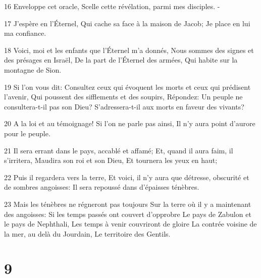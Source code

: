\par 16 Enveloppe cet oracle, Scelle cette révélation, parmi mes disciples. -
\par 17 J'espère en l'Éternel, Qui cache sa face à la maison de Jacob; Je place en lui ma confiance.
\par 18 Voici, moi et les enfants que l'Éternel m'a donnés, Nous sommes des signes et des présages en Israël, De la part de l'Éternel des armées, Qui habite sur la montagne de Sion.
\par 19 Si l'on vous dit: Consultez ceux qui évoquent les morts et ceux qui prédisent l'avenir, Qui poussent des sifflements et des soupirs, Répondez: Un peuple ne consultera-t-il pas son Dieu? S'adressera-t-il aux morts en faveur des vivants?
\par 20 A la loi et au témoignage! Si l'on ne parle pas ainsi, Il n'y aura point d'aurore pour le peuple.
\par 21 Il sera errant dans le pays, accablé et affamé; Et, quand il aura faim, il s'irritera, Maudira son roi et son Dieu, Et tournera les yeux en haut;
\par 22 Puis il regardera vers la terre, Et voici, il n'y aura que détresse, obscurité et de sombres angoisses: Il sera repoussé dans d'épaisses ténèbres.
\par 23 Mais les ténèbres ne régneront pas toujours Sur la terre où il y a maintenant des angoisses: Si les temps passés ont couvert d'opprobre Le pays de Zabulon et le pays de Nephthali, Les temps à venir couvriront de gloire La contrée voisine de la mer, au delà du Jourdain, Le territoire des Gentils.

\chapter{9}

